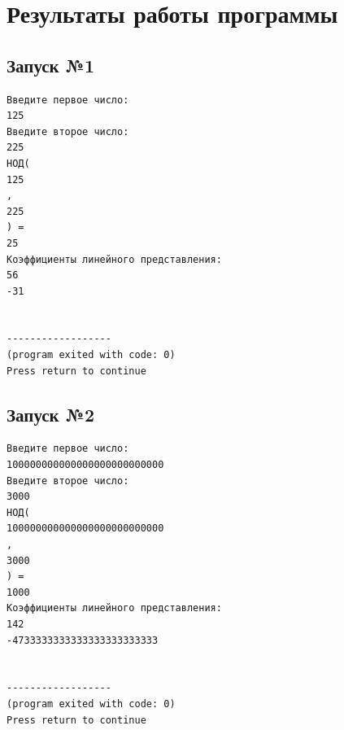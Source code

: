 \documentclass[a4paper,12pt]{article} %
\begin{document}
\clearpage

\section*{Результаты работы программы}

\subsection*{Запуск №1}

\begin{verbatim}
Введите первое число:
125
Введите второе число:
225
НОД(
125
,
225
) =
25
Коэффициенты линейного представления:
56
-31


------------------
(program exited with code: 0)
Press return to continue
\end{verbatim}

\subsection*{Запуск №2}
\begin{verbatim}
Введите первое число:
100000000000000000000000000
Введите второе число:
3000
НОД(
100000000000000000000000000
,
3000
) =
1000
Коэффициенты линейного представления:
142
-4733333333333333333333333


------------------
(program exited with code: 0)
Press return to continue
\end{verbatim}

\printbibliography
\end{document}
